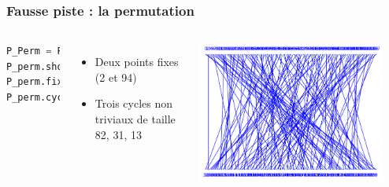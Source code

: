 
\begin{frame}[fragile] %
\frametitle{Fausse piste : la permutation}
  \begin{columns}[c]

        \begin{lstlisting}[language=Python]
P_Perm = Permutation(P)
P_perm.show("braid")
P_perm.fixed_points()
P_perm.cycle_tuples()
        \end{lstlisting}

        \begin{itemize}
            \item Deux points fixes (2 et 94)
            \item Trois cycles non triviaux de taille 82, 31, 13
        \end{itemize}
        \begin{center}                  
            \includegraphics[width=0.9\textwidth]{img/crypto/jafar/permutation.png}
        \end{center}
    \end{columns}

\end{frame}


